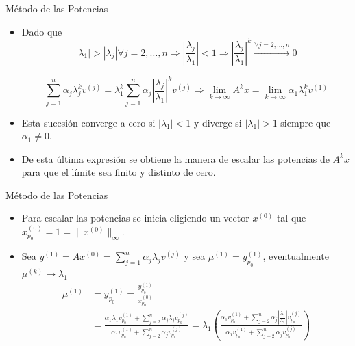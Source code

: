 \documentclass[11pt]{beamer}
\begin{document}
    \begin{frame}{M\'etodo de las Potencias}
      \begin{itemize}
        \item Dado que
        $$
          |\lambda_1|>|\lambda_j|\forall j=2,\ldots,n \Rightarrow \left|\frac{\lambda_j}{\lambda_1}\right|<1 \Rightarrow \left|\frac{\lambda_j}{\lambda_1}\right|^k\xrightarrow{\forall j=2,\ldots,n}0
          $$

          $$
          \sum_{j=1}^n\alpha_j\lambda_j^kv^{(j)} = \lambda_1^k\sum_{j=1}^n\alpha_j\left|\frac{\lambda_j}{\lambda_1}\right|^kv^{(j)} \Rightarrow \lim_{k \to \infty}A^kx = \lim_{k \to \infty}\alpha_1\lambda_1^kv^{(1)}
          $$
          \item<2-> Esta sucesi\'on converge a cero si $|\lambda_1|<1$ y diverge si $|\lambda_1|>1$ siempre que $\alpha_1\neq 0$.
          \item<3-> De esta \'ultima expresi\'on se obtiene la manera de escalar las potencias de $A^kx$ para que el l\'imite sea finito y distinto de cero.
          \end{itemize}
      \end{frame}
    \begin{frame}{M\'etodo de las Potencias}
      \begin{itemize}
        \item Para escalar las potencias se inicia eligiendo un vector $x^{(0)}$ tal que $x_{p_0}^{(0)}=1=\|x^{(0)}\|_{\infty}$.
        \item<2-> Sea $y^{(1)}=Ax^{(0)}=\sum_{j=1}^n\alpha_j\lambda_jv^{(j)}$ y sea $\mu^{(1)}=y_{p_0}^{(1)}$, eventualmente $\mu^{(k)}\to \lambda_1$
        {\small
        \begin{align*}
\mu^{(1)} &= y_{p_0}^{(1)} = \frac{y_{p_0}^{(1)}}{x_{p_0}^{(0)}}\\
& = \displaystyle\frac{\alpha_1\lambda_1v_{p_0}^{(1)}+\displaystyle\sum_{j=2}^n\alpha_j\lambda_jv_{p_0}^{(j)}}{\alpha_1v_{p_0}^{(1)}+\displaystyle\sum_{j=2}^n\alpha_jv_{p_0}^{(j)}} = \lambda_1\left(\displaystyle\frac{\alpha_1v_{p_0}^{(1)}+\displaystyle\sum_{j=2}^n\alpha_j\left|\frac{\lambda_j}{\lambda_1}\right|v_{p_0}^{(j)}}{\alpha_1v_{p_0}^{(1)}+\displaystyle\sum_{j=2}^n\alpha_jv_{p_0}^{(j)}}\right)
\end{align*}}
        
      \end{itemize}
    \end{frame}
\end{document}
